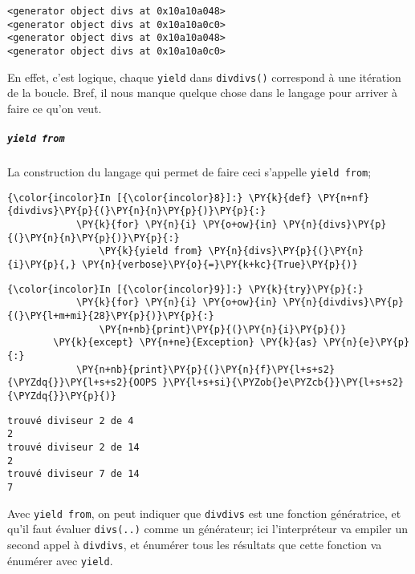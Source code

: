     \begin{Verbatim}[commandchars=\\\{\}]
<generator object divs at 0x10a10a048>
<generator object divs at 0x10a10a0c0>
<generator object divs at 0x10a10a048>
<generator object divs at 0x10a10a0c0>

    \end{Verbatim}

    En effet, c'est logique, chaque \texttt{yield} dans \texttt{divdivs()}
correspond à une itération de la boucle. Bref, il nous manque quelque
chose dans le langage pour arriver à faire ce qu'on veut.

    \hypertarget{yield-from}{%
\subparagraph{\texorpdfstring{\texttt{yield\ from}}{yield from}}\label{yield-from}}

    La construction du langage qui permet de faire ceci s'appelle
\texttt{yield\ from};

    \begin{Verbatim}[commandchars=\\\{\}]
{\color{incolor}In [{\color{incolor}8}]:} \PY{k}{def} \PY{n+nf}{divdivs}\PY{p}{(}\PY{n}{n}\PY{p}{)}\PY{p}{:}
            \PY{k}{for} \PY{n}{i} \PY{o+ow}{in} \PY{n}{divs}\PY{p}{(}\PY{n}{n}\PY{p}{)}\PY{p}{:}
                \PY{k}{yield from} \PY{n}{divs}\PY{p}{(}\PY{n}{i}\PY{p}{,} \PY{n}{verbose}\PY{o}{=}\PY{k+kc}{True}\PY{p}{)}
\end{Verbatim}


    \begin{Verbatim}[commandchars=\\\{\}]
{\color{incolor}In [{\color{incolor}9}]:} \PY{k}{try}\PY{p}{:}
            \PY{k}{for} \PY{n}{i} \PY{o+ow}{in} \PY{n}{divdivs}\PY{p}{(}\PY{l+m+mi}{28}\PY{p}{)}\PY{p}{:}
                \PY{n+nb}{print}\PY{p}{(}\PY{n}{i}\PY{p}{)}
        \PY{k}{except} \PY{n+ne}{Exception} \PY{k}{as} \PY{n}{e}\PY{p}{:}
            \PY{n+nb}{print}\PY{p}{(}\PY{n}{f}\PY{l+s+s2}{\PYZdq{}}\PY{l+s+s2}{OOPS }\PY{l+s+si}{\PYZob{}e\PYZcb{}}\PY{l+s+s2}{\PYZdq{}}\PY{p}{)}
\end{Verbatim}


    \begin{Verbatim}[commandchars=\\\{\}]
trouvé diviseur 2 de 4
2
trouvé diviseur 2 de 14
2
trouvé diviseur 7 de 14
7

    \end{Verbatim}

    Avec \texttt{yield\ from}, on peut indiquer que \texttt{divdivs} est une
fonction génératrice, et qu'il faut évaluer \texttt{divs(..)} comme un
générateur; ici l'interpréteur va empiler un second appel à
\texttt{divdivs}, et énumérer tous les résultats que cette fonction va
énumérer avec \texttt{yield}.


    
    
    
